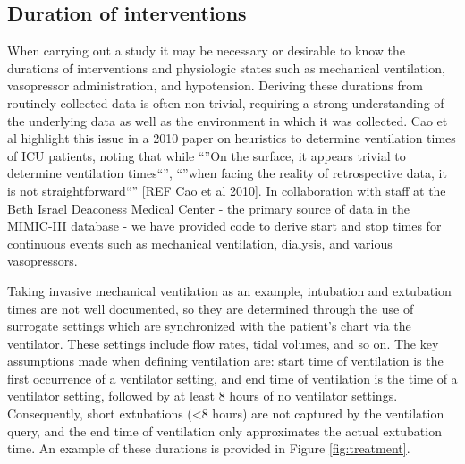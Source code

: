\documentclass{elsart}
\begin{document}
\subsection{Duration of interventions}



When carrying out a study it may be necessary or desirable to know the durations of interventions and physiologic states such as mechanical ventilation, vasopressor administration, and hypotension. Deriving these durations from routinely collected data is often non-trivial, requiring a strong understanding of the underlying data as well as the environment in which it was collected. Cao et al highlight this issue in a 2010 paper on heuristics to determine ventilation times of ICU patients, noting that while ``''On the surface, it appears trivial to determine ventilation times``'', ``''when facing the reality of retrospective data, it is not straightforward``'' [REF Cao et al 2010]. In collaboration with staff at the Beth Israel Deaconess Medical Center - the primary source of data in the MIMIC-III database - we have provided code to derive start and stop times for continuous events such as mechanical ventilation, dialysis, and various vasopressors. 

Taking invasive mechanical ventilation as an example, intubation and extubation times are not well documented, so they are determined through the use of surrogate settings which are synchronized with the patient's chart via the ventilator. These settings include flow rates, tidal volumes, and so on. The key assumptions made when defining ventilation are: start time of ventilation is the first occurrence of a ventilator setting, and end time of ventilation is the time of a ventilator setting, followed by at least 8 hours of no ventilator settings. Consequently, short extubations (<8 hours) are not captured by the ventilation query, and the end time of ventilation only approximates the actual extubation time. An example of these durations is provided in Figure \ref{fig:treatment}.
\end{document}
